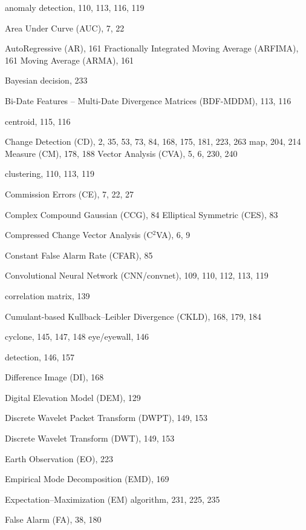 \documentclass[fleqn,treatise,allpages]{ISTE_Science}
\begin{document}

\begin{theindex}
  \item anomaly detection, 110, 113, 116, 119
  \item Area Under Curve (AUC), 7, 22
  \item AutoRegressive (AR), 161
  \subitem Fractionally Integrated Moving Average (ARFIMA),
		161
  \subitem Moving Average (ARMA), 161
  \item Bayesian decision, 233
  \item Bi-Date Features -- Multi-Date Divergence Matrices (BDF-MDDM),
		113, 116
  \item centroid, 115, 116
  \item Change
  \subitem Detection (CD), 2, 35, 53, 73, 84, 168, 175, 181, 223, 263
  \subitem map, 204, 214
  \subitem Measure (CM), 178, 188
  \subitem Vector Analysis (CVA), 5, 6, 230, 240
  \item clustering, 110, 113, 119
  \item Commission Errors (CE), 7, 22, 27
  \item Complex
  \subitem Compound Gaussian (CCG), 84
  \subitem Elliptical Symmetric (CES), 83
  \item Compressed Change Vector Analysis (C$^{2}$VA), 6, 9
  \item Constant False Alarm Rate (CFAR), 85
  \item Convolutional Neural Network (CNN/convnet), 109, 110, 112, 113, 119
  \item correlation matrix, 139
  \item Cumulant-based Kullback--Leibler Divergence (CKLD), 168, 179,
		184
  \item cyclone, 145, 147, 148
  \subitem eye/eyewall, 146
  \item detection, 146, 157
  \item Difference Image (DI), 168
  \item Digital Elevation Model (DEM), 129
  \item Discrete Wavelet Packet Transform (DWPT), 149, 153
  \item Discrete Wavelet Transform (DWT), 149, 153
  \item Earth Observation (EO), 223
  \item Empirical Mode Decomposition (EMD), 169
  \item Expectation--Maximization (EM) algorithm, 231, 225, 235
  \item False Alarm (FA), 38, 180

\end{theindex}
\end{document}
